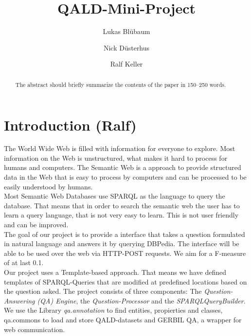 \documentclass[runningheads]{llncs}
\begin{document}
%
\title{QALD-Mini-Project}
%
%
\author{Lukas Bl{\"u}baum \and
Nick D{\"u}sterhus \and
Ralf Keller}
%
%

%
\maketitle              %
%
\begin{abstract}
The abstract should briefly summarize the contents of the paper in
150--250 words.

\end{abstract}
%
%
%
\section{Introduction (Ralf)}  

The World Wide Web is filled with information for everyone to explore. Most information on the Web is unstructured, what makes it hard to process for humans and computers. The Semantic Web is a approach to provide structured data in the Web that is easy to process by computers and can be processed to be easily understood by humans. \\

Most Semantic Web Databases use SPARQL as the language to query the database. That means that in order to search the semantic web the user has to learn a query language, that is not very easy to learn. This is not user friendly and can be improved. \\

The goal of our project is to provide a interface that takes a question formulated in natural language and answers it by querying DBPedia. The interface will be able to be used over the web via HTTP-POST requests. We aim for a F-measure of at last 0.1. \\

Our project uses a Template-based approach. That means we have defined templates of SPARQL-Queries that are modified at predefined locations based on the question asked. The project consists of three components: The \emph{Question-Answering (QA) Engine}, the \emph{Question-Processor} and the \emph{SPARQLQueryBuilder}. We use the Library \emph{qa.annotation} to find entities, propierties and classes, qa.commons to load and store QALD-datasets and GERBIL QA, a wrapper for web communication.   \\
\end{document}
